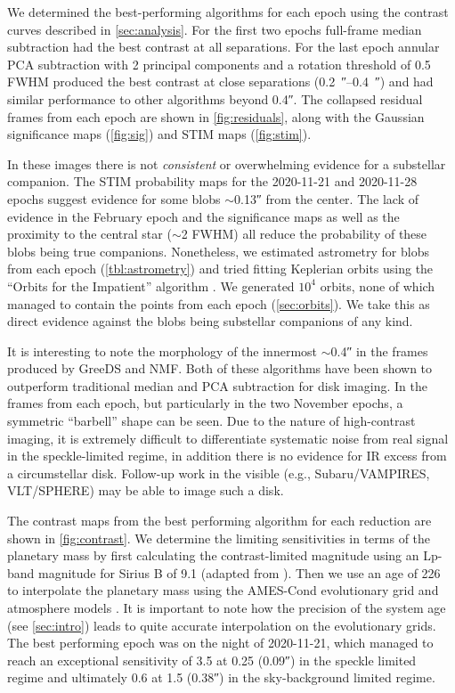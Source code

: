 \documentclass[twocolumn]{aastex631}
\begin{document}
We determined the best-performing algorithms for each epoch using the contrast curves described in \autoref{sec:analysis}. For the first two epochs full-frame median subtraction had the best contrast at all separations. For the last epoch annular PCA subtraction with 2 principal components and a rotation threshold of 0.5 FWHM produced the best contrast at close separations (\qtyrange{0.2}{0.4}{\arcsecond}) and had similar performance to other algorithms beyond \ang{;;0.4}. The collapsed residual frames from each epoch are shown in \autoref{fig:residuals}, along with the Gaussian significance maps (\autoref{fig:sig}) and STIM maps (\autoref{fig:stim}).

In these images there is not \textit{consistent} or overwhelming evidence for a substellar companion. The STIM probability maps for the 2020-11-21 and 2020-11-28 epochs suggest evidence for some blobs $\sim$\ang{;;0.13} from the center. The lack of evidence in the February epoch and the significance maps as well as the proximity to the central star ($\sim$2 FWHM) all reduce the probability of these blobs being true companions. Nonetheless, we estimated astrometry for blobs from each epoch (\autoref{tbl:astrometry}) and tried fitting Keplerian orbits using the ``Orbits for the Impatient'' algorithm \citep[OFTI;][]{blunt_orbits_2017}. We generated $10^4$ orbits, none of which managed to contain the points from each epoch (\autoref{sec:orbits}). We take this as direct evidence against the blobs being substellar companions of any kind.

It is interesting to note the morphology of the innermost $\sim$\ang{;;0.4} in the frames produced by GreeDS and NMF. Both of these algorithms have been shown to outperform traditional median and PCA subtraction for disk imaging. In the frames from each epoch, but particularly in the two November epochs, a symmetric ``barbell'' shape can be seen. Due to the nature of high-contrast imaging, it is extremely difficult to differentiate systematic noise from real signal in the speckle-limited regime, in addition there is no evidence for IR excess from a circumstellar disk. Follow-up work in the visible (e.g., Subaru/VAMPIRES, VLT/SPHERE) may be able to image such a disk.

The contrast maps from the best performing algorithm for each reduction are shown in \autoref{fig:contrast}. We determine the limiting sensitivities in terms of the planetary mass by first calculating the contrast-limited magnitude using an Lp-band magnitude for Sirius B of 9.1 (adapted from \citealp{bonnet-bidaud_adonis_2008}). Then we use an age of \qty{226}{\mega\year} to interpolate the planetary mass using the AMES-Cond evolutionary grid and atmosphere models \citep{allard_models_2012}. It is important to note how the precision of the system age (see \autoref{sec:intro}) leads to quite accurate interpolation on the evolutionary grids. The best performing epoch was on the night of 2020-11-21, which managed to reach an exceptional sensitivity of \qty{3.5}{\jupitermass} at \qty{0.25}{\au} (\ang{;;0.09}) in the speckle limited regime and ultimately \qty{0.6}{\jupitermass} at \qty{1.5}{\au} (\ang{;;0.38}) in the sky-background limited regime.
\end{document}
